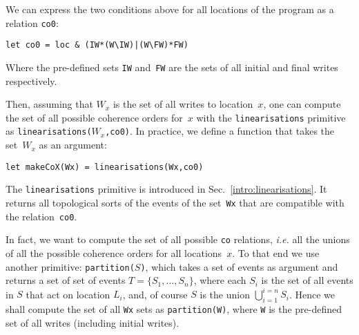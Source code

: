 We can express the two conditions above for all locations of the program
as a relation \texttt{co0}:
\begin{verbatim}
let co0 = loc & (IW*(W\IW)|(W\FW)*FW)
\end{verbatim}
Where the pre-defined sets \texttt{IW} and~\texttt{FW} are the sets
of all initial and final writes respectively.

Then, assuming that $W_x$ is the set of all writes to location~$x$, one
can compute the set of all possible coherence orders for~$x$ with
the \texttt{linearisations} primitive as \texttt{linearisations($W_x$,co0)}.
In practice, we define a function that takes the set~$W_x$ as an argument:
\begin{verbatim}
let makeCoX(Wx) = linearisations(Wx,co0)
\end{verbatim}
The \texttt{linearisations} primitive is introduced in
Sec.~\ref{intro:linearisations}. It returns all topological sorts
of the events  of the set~\texttt{Wx} that are compatible
with the relation~\texttt{co0}.


In fact, we want to compute the set of all possible \texttt{co} relations,
\emph{i.e.} all the unions of all the possible coherence orders for all
locations~$x$. To that end we use another \cat{} primitive:
\texttt{partition($S$)}, which takes a set of events as argument and
returns a set of set of events $T = \{S_1,\ldots,S_n\}$, where each
$S_i$ is the set of all events in $S$ that act on location $L_i$,
and, of course $S$ is the union $\bigcup_{i=1}^{i=n} S_i$.
Hence we shall compute the set of all \texttt{Wx} sets
as \texttt{partition(W)},
where \texttt{W} is the pre-defined set of all writes (including initial
writes).

